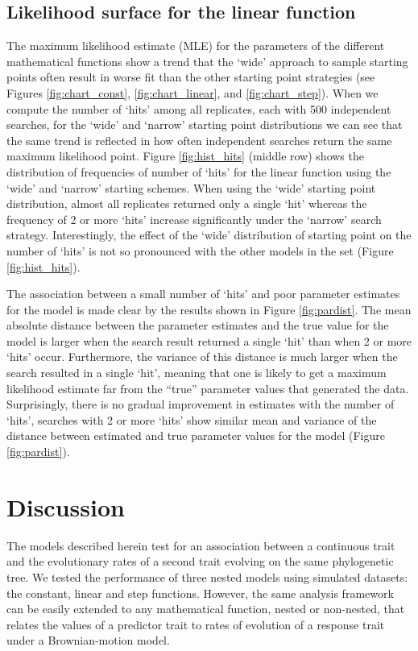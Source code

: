 \subsection{Likelihood surface for the linear function}

The maximum likelihood estimate (MLE) for the parameters of the different mathematical functions show a trend that the `wide' approach to sample starting points often result in worse fit than the other starting point strategies (see Figures \ref{fig:chart_const}, \ref{fig:chart_linear}, and \ref{fig:chart_step}). When we compute the number of `hits' among all replicates, each with 500 independent searches, for the `wide' and `narrow' starting point distributions we can see that the same trend is reflected in how often independent searches return the same maximum likelihood point. Figure \ref{fig:hist_hits} (middle row) shows the distribution of frequencies of number of `hits' for the linear function using the `wide' and `narrow' starting schemes. When using the `wide' starting point distribution, almost all replicates returned only a single `hit' whereas the frequency of 2 or more `hits' increase significantly under the `narrow' search strategy. Interestingly, the effect of the `wide' distribution of starting point on the number of `hits' is not so pronounced with the other models in the set (Figure \ref{fig:hist_hits}).

The association between a small number of `hits' and poor parameter estimates for the model is made clear by the results shown in Figure \ref{fig:pardist}. The mean absolute distance between the parameter estimates and the true value for the model is larger when the search result returned a single `hit' than when 2 or more `hits' occur. Furthermore, the variance of this distance is much larger when the search resulted in a single `hit', meaning that one is likely to get a maximum likelihood estimate far from the ``true'' parameter values that generated the data. Surprisingly, there is no gradual improvement in estimates with the number of `hits', searches with 2 or more `hits' show similar mean and variance of the distance between estimated and true parameter values for the model (Figure \ref{fig:pardist}).

\section{Discussion}

The models described herein test for an association between a continuous trait and the evolutionary rates of a second trait evolving on the same phylogenetic tree. We tested the performance of three nested models using simulated datasets: the constant, linear and step functions. However, the same analysis framework can be easily extended to any mathematical function, nested or non-nested, that relates the values of a predictor trait to rates of evolution of a response trait under a Brownian-motion model.

